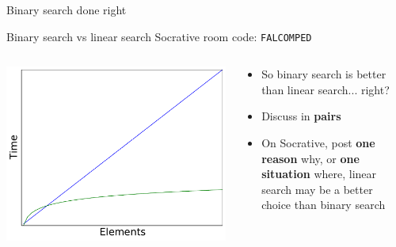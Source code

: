 \begin{frame}{Binary search done right}
	
\end{frame}

\begin{frame}{Binary search vs linear search}
	Socrative room code: \texttt{FALCOMPED}
	\begin{columns}
		\begin{column}{0.45\textwidth}
			\includegraphics[width=\textwidth]{plot2_linear_log}
		\end{column}
		\begin{column}{0.55\textwidth}
			\begin{itemize}
				\item So binary search is better than linear search... right? \pause
				\item Discuss in \textbf{pairs}
				\item On Socrative, post \textbf{one reason} why, or \textbf{one situation} where,
					linear search may be a better choice than binary search
			\end{itemize}
		\end{column}
	\end{columns}
\end{frame}

